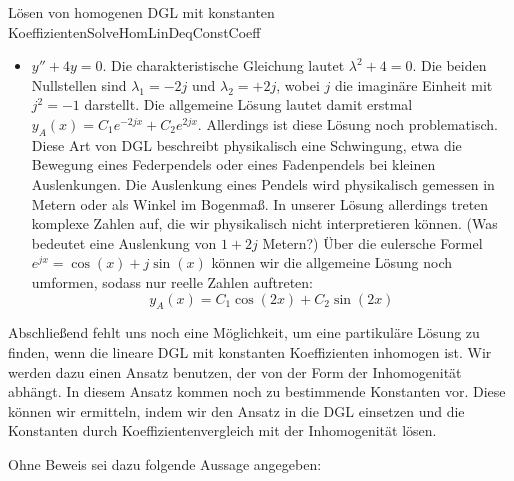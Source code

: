 \begin{example}{Lösen von homogenen DGL mit konstanten Koeffizienten}{SolveHomLinDeqConstCoeff}
\begin{itemize}
        \item $y''+4y=0$. Die charakteristische Gleichung lautet $\lambda^2+4=0$. Die beiden Nullstellen sind $\lambda_1 = - 2j$ und $\lambda_2 = + 2j$, wobei $j$ die imaginäre Einheit mit $j^2=-1$ darstellt. Die allgemeine Lösung lautet damit erstmal $y_A(x) = C_1 e^{-2jx} + C_2 e^{2jx}$. Allerdings ist diese Lösung noch problematisch. Diese Art von DGL beschreibt physikalisch eine Schwingung, etwa die Bewegung eines Federpendels oder eines Fadenpendels bei kleinen Auslenkungen. Die Auslenkung eines Pendels wird physikalisch gemessen in Metern oder als Winkel im Bogenmaß. In unserer Lösung allerdings treten komplexe Zahlen auf, die wir physikalisch nicht interpretieren können. (Was bedeutet eine Auslenkung von $1+2j$ Metern?) Über die eulersche Formel $e^{jx} = \cos(x) + j \sin(x)$ können wir die allgemeine Lösung noch umformen, sodass nur reelle Zahlen auftreten:
        $$
            y_A(x) = C_1 \cos(2x) + C_2 \sin(2x)
        $$
    \end{itemize}
\end{example}

Abschließend fehlt uns noch eine Möglichkeit, um eine partikuläre Lösung zu finden, wenn die lineare DGL mit konstanten Koeffizienten inhomogen ist. Wir werden dazu einen Ansatz benutzen, der von der Form der Inhomogenität abhängt. In diesem Ansatz kommen noch zu bestimmende Konstanten vor. Diese können wir ermitteln, indem wir den Ansatz in die DGL einsetzen und die Konstanten durch Koeffizientenvergleich mit der Inhomogenität lösen.

Ohne Beweis sei dazu folgende Aussage angegeben:

